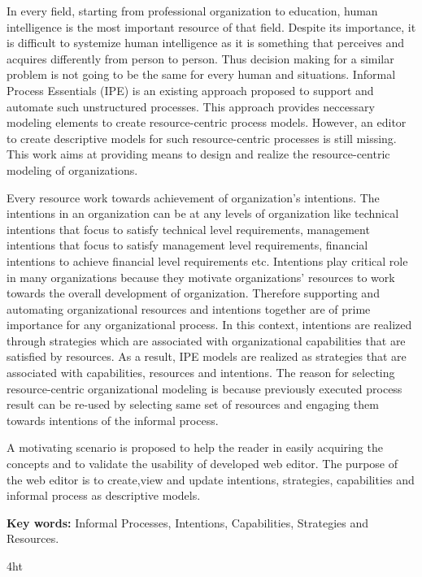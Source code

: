 \documentclass[
               fontsize=12pt, %
               paper=a4,
               twoside, %
               BCOR=3mm, %
               DIV=13,   %
               headinclude=true,
               footinclude=false,
               bibliography=totoc,
               headsepline,
               cleardoublepage=empty,
               parskip=half,
               pointlessnumbers, %
               final   %
               ]{scrbook}
\begin{document}
In every field, starting from professional organization to education, human intelligence is the most important resource of that field. Despite its importance, it is difficult to systemize human intelligence as it is something that perceives and acquires differently from person to person. Thus decision making for a similar problem is not going to be the same for every human and situations. Informal Process Essentials (IPE) is an existing approach proposed to support and automate such unstructured processes. This approach provides neccessary modeling elements to create resource-centric process models. However, an editor to create descriptive models for such resource-centric processes is still missing. This work aims at providing means to design and realize the resource-centric modeling of organizations.

Every resource work towards achievement of organization's intentions. The intentions in an organization can be at any levels of organization like technical intentions that focus to satisfy technical level requirements, management intentions that focus to satisfy management level requirements, financial intentions to achieve financial level requirements etc. Intentions play critical role in many organizations because they motivate organizations' resources to work towards the overall development of organization. Therefore supporting and automating organizational resources and intentions together are of prime importance for any organizational process. In this context, intentions are realized through strategies which are associated with organizational capabilities that are satisfied by resources. As a result, IPE models are realized as strategies that are associated with capabilities, resources and intentions. The reason for selecting resource-centric organizational modeling is because previously executed process result can be re-used by selecting same set of resources and engaging them towards intentions of the informal process. 

  A  motivating scenario is proposed to help the reader in easily acquiring the concepts and to validate the usability of developed web editor. The purpose of the web editor is to create,view and update intentions, strategies, capabilities and informal process as descriptive models. 

\textbf{Key words:} Informal Processes, Intentions, Capabilities, Strategies and Resources. 


\iftex4ht
\else
{}
\fi
\end{document}
